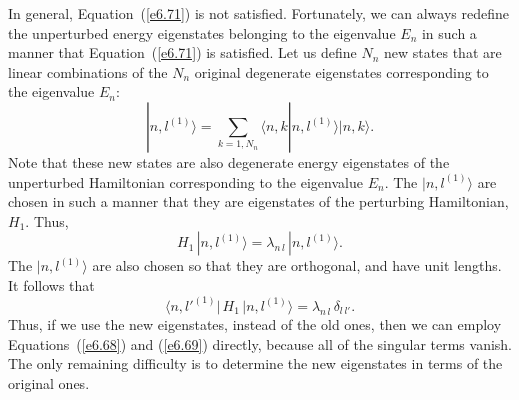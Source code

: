 In general, Equation~(\ref{e6.71}) is not satisfied. Fortunately, we can always redefine
the unperturbed energy eigenstates belonging to the eigenvalue $E_n$ in such
a manner that Equation~(\ref{e6.71}) is satisfied. Let us define $N_n$ new states
that  are linear combinations of the $N_n$ original degenerate
eigenstates corresponding
to the eigenvalue $E_n$:
\begin{equation}
|n,l^{(1)}\rangle = \sum_{k=1,N_n} \langle n,k|n,l^{(1)}\rangle |n,k\rangle.
\end{equation}
Note that these new states are also degenerate energy eigenstates 
of the unperturbed Hamiltonian corresponding to the eigenvalue $E_n$. 
The $|n,l^{(1)}\rangle$ are chosen in
such a manner that they are eigenstates of the perturbing
Hamiltonian, $H_1$. Thus,
\begin{equation}\label{e6.71a}
H_1\, |n, l^{(1)}\rangle = \lambda_{n\,l} \,|n, l^{(1)}\rangle.
\end{equation}
The $|n,l^{(1)}\rangle$ are also chosen so that they are orthogonal,
and have unit lengths.
It follows that
\begin{equation}
\langle n, l'^{(1)} | \,H_1\,|n, l^{(1)}\rangle = \lambda_{n\,l}\,\delta_{l\,l'}.
\end{equation}
Thus, if we use the new eigenstates, instead of the old ones, then we can employ
Equations~(\ref{e6.68}) and (\ref{e6.69}) directly, because all of the singular terms vanish.
The only remaining difficulty is to determine the new eigenstates in terms of
the original ones.  


